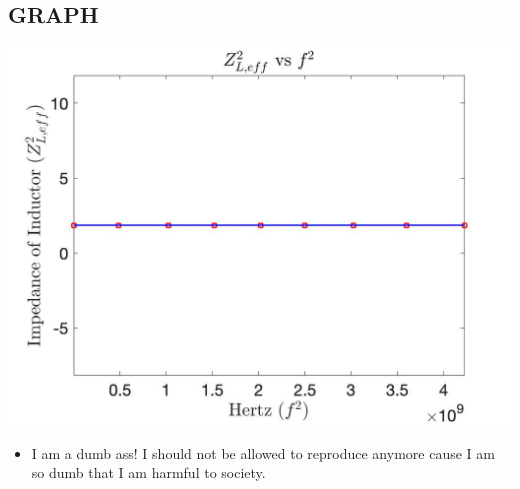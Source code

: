 \documentclass{article}
\begin{document}
\begin{center}
  \subsection*{GRAPH}
  \includegraphics[width=\textwidth]{graph.jpg}
\end{center}
\begin{itemize}
  \item I am a dumb ass! I should not be allowed to reproduce anymore cause I am so dumb that I am harmful to society.
\end{itemize}
\end{document}
